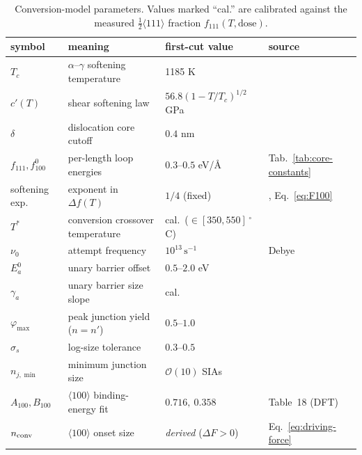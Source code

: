\begin{table}[ht]
\centering
\caption{Conversion-model parameters. Values marked ``cal.'' are calibrated
against the measured $\tfrac12\langle111\rangle$ fraction $f_{111}(T,\text{dose})$.}
\label{tab:conversion-params}
\begin{tabular}{llll}
\toprule
symbol & meaning & first-cut value & source \\
\midrule
$T_c$            & $\alpha$--$\gamma$ softening temperature & 1185 K & \cite{Dudarev2008} \\
$c'(T)$          & shear softening law & $56.8(1{-}T/T_c)^{1/2}$ GPa & \cite{Dudarev2008} \\
$\delta$         & dislocation core cutoff & $0.4$ nm & \cite{Dudarev2008} \\
$f_{111},f_{100}^{0}$ & per-length loop energies & $0.3$--$0.5$ eV/\AA & Tab.~\ref{tab:core-constants} \\
softening exp.   & exponent in $\Delta f(T)$ & $1/4$ (fixed) & \cite{Dudarev2008}, Eq.~\eqref{eq:F100} \\
$T^\ast$         & conversion crossover temperature & cal.\ ($\in[350,550]\,^\circ$C) & \cite{Dudarev2008} \\
$\nu_0$          & attempt frequency & $10^{13}\,\mathrm{s}^{-1}$ & Debye \\
$E_a^{0}$        & unary barrier offset & $0.5$--$2.0$ eV & \cite{Marian2002} \\
$\gamma_a$       & unary barrier size slope & cal. & \cite{Arakawa2006} \\
$\varphi_{\max}$ & peak junction yield ($n{=}n'$) & $0.5$--$1.0$ & \cite{Marian2002} \\
$\sigma_s$       & log-size tolerance & $0.3$--$0.5$ & \cite{Marian2002} \\
$n_{j,\min}$     & minimum junction size & $\mathcal O(10)$ SIAs & \cite{Marian2002} \\
$A_{100},B_{100}$& $\langle100\rangle$ binding-energy fit & $0.716,\ 0.358$ & Table~18 (DFT) \\
$n_{\rm conv}$   & $\langle100\rangle$ onset size & \emph{derived} ($\Delta F{>}0$) & Eq.~\eqref{eq:driving-force} \\
\bottomrule
\end{tabular}
\end{table}

